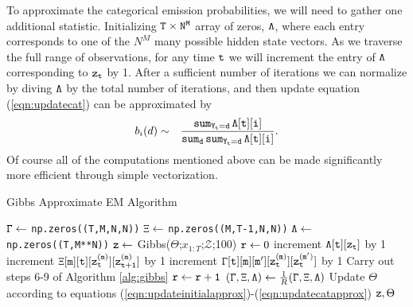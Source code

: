 \documentclass{amsart}
\begin{document}
To approximate the categorical emission probabilities, we will need to 
gather one additional statistic.  Initializing ${\tt T\times N^M}$ 
array of zeros, ${\tt \Lambda}$, where each entry corresponds to one of the $N^M$ 
many possible hidden state vectors.  As we traverse the full range of 
observations, for any time ${\tt t}$ we will increment the entry of 
${\tt \Lambda}$ corresponding to ${\tt z_t}$ by 1.  After a sufficient 
number of iterations we can normalize by diving ${\tt \Lambda}$ by the 
total number of iterations, and then update equation 
(\ref{eqn:updatecat}) can be approximated by 
\begin{eqnarray}\label{eqn:updatecatapprox}
b_i(d) & \sim & \frac{{\tt sum_{Y_t = d}\,\Lambda[t][i]}}{{\tt 
sum_d\,sum_{Y_t = d}\,\Lambda[t][i]}}.
\end{eqnarray}
Of course all of the computations mentioned above can be made 
significantly more efficient through simple vectorization. 

\begin{algorithm}
  \caption{Gibbs Approximate EM Algorithm\label{alg:gibbs_learning}}
  \begin{algorithmic}[1]
    \State ${\tt \Gamma}\leftarrow$ {\tt np.zeros((T,M,N,N))}
    \State ${\tt \Xi}\leftarrow$ {\tt np.zeros((M,T-1,N,N))}
    \State ${\tt \Lambda}\leftarrow$ {\tt np.zeros((T,M**N))}
    \State $\tt{z} \leftarrow$ {\sc Gibbs}($\Theta$;$x_{1:T}$;$\mathcal 
		Z$;100) 
    \State ${\tt r}\leftarrow 0$
		\State increment ${\tt\Lambda[t][z_t]}$ by 1
				\State increment ${\tt \Xi[m][t][z_t^{(m)}][z_{t+1}^{(m)}]}$ by 1
			\EndIf
				\State increment ${\tt 
				\Gamma[t][m][m'][z_t^{(m)}][z_{t}^{(m')}]}$ by 1
			\EndFor
			\State Carry out steps 6-9 of Algorithm \ref{alg:gibbs}
		\EndFor
      \EndFor
      \State ${\tt r}\leftarrow {\tt r+1}$
      \EndWhile
      \State $({\tt \Gamma,\Xi,\Lambda})\leftarrow \frac{1}{R}({\tt 
      \Gamma,\Xi,\Lambda})$
      \State Update $\Theta$ according to equations 
      (\ref{eqn:updateinitialapprox})-(\ref{eqn:updatecatapprox})
      \State\Return ${\tt z},\Theta$
    \EndFunction
  \end{algorithmic}
\end{algorithm}
\end{document}
